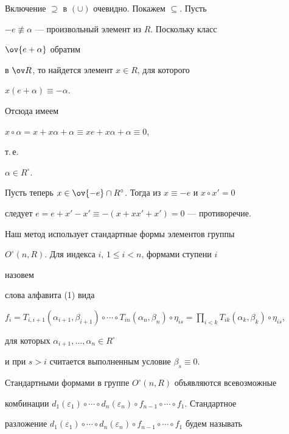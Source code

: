 \begin{pf} 


Включение $\supseteq$ в $(\cup)$ очевидно. Покажем $\subseteq$. Пусть 


$-e\not\equiv\alpha$ --- произвольный элемент из $R$. Поскольку класс 


$\ov{e+\alpha}$ обратим 


в $\ov R$, то найдется элемент $x\in R$, для которого 


$x(e+\alpha)\equiv-\alpha$. 


Отсюда имеем 


$x\circ\alpha=x+x \alpha+\alpha\equiv x e+x\alpha+\alpha\equiv0$, 


т.\,е. 


$\alpha\in R^\circ$. 


 


Пусть теперь $x\in\ov{-e}\cap R^\circ$. Тогда из $x\equiv-e$ и $x\circ 


x'=0$ 


следует $e=e+x'-x'\equiv-(x+x x'+x')=0$ --- противоречие. 


\end{pf} 


 


Наш метод использует стандартные формы элементов группы 


$O^\circ(n,R)$. Для индекса $i$, $1\le i<n$, формами ступени $i$ 


назовем 


слова алфавита (1) вида 


$f_i=T_{i,i+1}(\alpha_{i+1},\beta_{i+1})\circ\dotsb\circ 


T_{in}(\alpha_n,\beta_n)\circ\eta_{is}=\prod\limits_{i<k}T_{ik}


(\alpha_k,\beta_k)\circ\eta_{is}$, 


для которых $\alpha_{i+1},\dotsc,\alpha_n\in R^\circ$ 


и при $s>i$ считается выполненным условие $\beta_s\equiv0$. 


Стандартными формами в группе $O^\circ(n,R)$ объявляются всевозможные 


комбинации $d_1(\varepsilon_1)\circ\dotsb\circ d_n(\varepsilon_n)\circ 


f_{n-1}\circ\dotsb\circ f_1$. Стандартное 


разложение $d_1(\varepsilon_1)\circ\dotsb\circ d_n(\varepsilon_n)\circ 


f_{n-1}\circ\dotsb\circ f_1$ будем называть 


